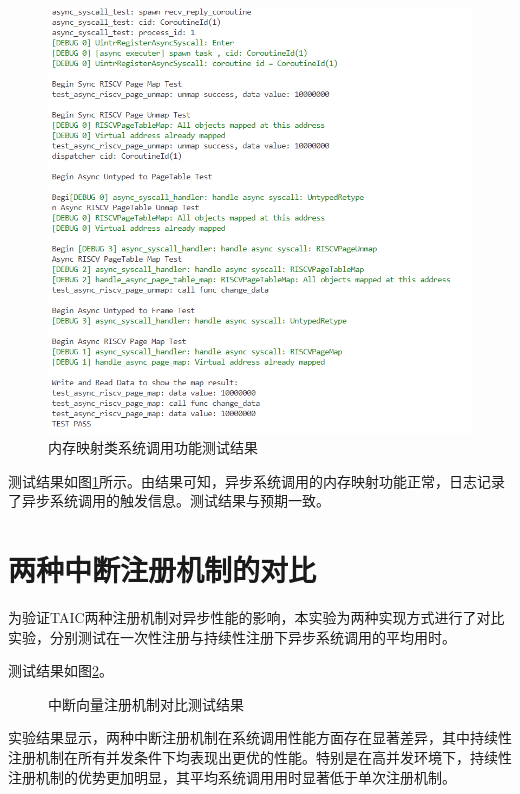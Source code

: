\begin{figure}[htbp]
  \centering
  \includegraphics[width=\textwidth]{images/memtest.png}
  \caption{内存映射类系统调用功能测试结果}\label{memtest}
\end{figure}

测试结果如图\ref{memtest}所示。由结果可知，异步系统调用的内存映射功能正常，日志记录了异步系统调用的触发信息。测试结果与预期一致。

\section{两种中断注册机制的对比}\label{sec:regintctest}

为验证TAIC两种注册机制对异步性能的影响，本实验为两种实现方式进行了对比实验，分别测试在一次性注册与持续性注册下异步系统调用的平均用时。

测试结果如图\ref{中断向量注册机制对比测试结果}。



\begin{figure}[htbp]
  \centering
  
  \caption{中断向量注册机制对比测试结果}\label{中断向量注册机制对比测试结果}
\end{figure}

实验结果显示，两种中断注册机制在系统调用性能方面存在显著差异，其中持续性注册机制在所有并发条件下均表现出更优的性能。特别是在高并发环境下，持续性注册机制的优势更加明显，其平均系统调用用时显著低于单次注册机制。

